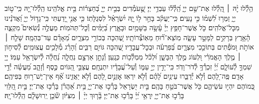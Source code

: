 \documentclass[twoside, openany, parskip=half, 11pt]{book}
\begin{document}
\begin{narrow}
הַ֥לְ֯לוּ יׇ֨הּ ׀
הַֽ֭לְ֯לוּ אֶת־שֵׁ֣ם יְיָ֑ הַֽ֝לְ֯ל֗וּ עַבְדֵ֥י יְיָ׃
שֶׁ֣֭עֹמְ֯דִים בְּבֵ֣ית יְיָ֑ בְּ֝חַצְר֗וֹת בֵּ֣ית אֱלֹהֵֽינוּ׃
הַֽלְ֯לוּ־יׇ֭הּ כִּֽי־ט֣וֹב יְיָ֑ זַמְּר֥וּ לִ֝שְׁמ֗וֹ כִּ֣י נָעִֽים׃
כִּֽי־יַעֲקֹ֗ב בָּחַ֣ר ל֣וֹ יׇ֑הּ יִ֝שְׂרָאֵ֗ל לִסְגֻלָּתֽוֹ׃
כִּ֤י אֲנִ֣י יָ֭דַעְתִּי כִּֽי־גָד֣וֹל יְיָ֑ וַ֝אֲדֹנֵ֗ינוּ מִכׇּל־אֱלֹהִֽים׃
כֹּ֤ל אֲשֶׁר־חָפֵ֥ץ יְיָ֗ עָ֫שָׂ֥ה בַּשָּׁמַ֥יִם וּבָאָ֑רֶץ בַּ֝יַּמִּ֗ים וְ֯כׇל־תְּהֹמֽוֹת׃
מַעֲלֶ֣ה נְ֯שִׂאִים֮ מִקְצֵ֢ה הָ֫אָ֥רֶץ בְּרָקִ֣ים לַמָּטָ֣ר עָשָׂ֑ה מֽוֹצֵא־ר֗֝וּחַ מֵאֽוֹצְ֯רוֹתָֽיו׃
שֶׁ֭הִכָּה בְּכוֹרֵ֣י מִצְרָ֑יִם מֵ֝אָדָ֗ם עַד־בְּהֵמָֽה׃
שָׁלַ֤ח ׀ אוֹתֹ֣ת וּ֭מֹפְ֯תִים בְּתוֹכֵ֣כִי מִצְרָ֑יִם בְּ֝פַרְעֹ֗ה וּבְכׇל־עֲבָדָֽיו׃
שֶׁ֭הִכָּה גּוֹיִ֣ם רַבִּ֑ים וְ֝הָרַ֗ג מְ֯לָכִ֥ים עֲצוּמִֽים׃
לְ֯סִיח֤וֹן ׀ מֶ֤לֶךְ הָאֱמֹרִ֗י וּ֭לְעוֹג מֶ֣לֶךְ הַבָּשָׁ֑ן וּ֝לְכֹ֗ל מַמְלְ֯כ֥וֹת כְּנָֽעַן׃
וְ֯נָתַ֣ן אַרְצָ֣ם נַחֲלָ֑ה נַ֝חֲלָ֗ה לְ֯יִשְׂרָאֵ֥ל עַמּֽוֹ׃
יְיָ֭ שִׁמְךָ֣ לְ֯עוֹלָ֑ם יְ֝יָ֗ זִכְרְ֯ךָ֥ לְ֯דֹר־וָדֹֽר׃
כִּֽי־יָדִ֣ין יְיָ֣ עַמּ֑וֹ וְ֯עַל־עֲ֝בָדָ֗יו יִתְנֶחָֽם׃
עֲצַבֵּ֣י הַ֭גּוֹיִם כֶּ֣סֶף וְ֯זָהָ֑ב מַ֝עֲשֵׂ֗ה יְ֯דֵ֣י אָדָֽם׃
פֶּֽה־לָ֭הֶם וְ֯לֹ֣א יְ֯דַבֵּ֑רוּ עֵינַ֥יִם לָ֝הֶ֗ם וְ֯לֹ֣א יִרְאֽוּ׃
אׇזְנַ֣יִם לָ֭הֶם וְ֯לֹ֣א יַאֲזִ֑ינוּ אַ֗֝ף אֵין־יֶשׁ־ר֥וּחַ בְּפִיהֶֽם׃
כְּ֭מוֹהֶם יִהְי֣וּ עֹשֵׂיהֶ֑ם כֹּ֖ל אֲשֶׁר־בֹּטֵ֣חַ בָּהֶֽם׃
בֵּ֣ית יִ֭שְׂרָאֵל בָּרְ֯כ֣וּ אֶת־יְיָ֑ בֵּ֥ית אַ֝הֲרֹ֗ן בָּרְ֯כ֥וּ אֶת־יְיָ׃
בֵּ֣ית הַ֭לֵּוִי בָּרְ֯כ֣וּ אֶת־יְיָ֑ יִֽרְאֵ֥י יְ֝יָ֗ בָּרְ֯כ֥וּ אֶת־יְיָ׃
בָּ֘ר֤וּךְ יְיָ֨ ׀ מִצִּיּ֗וֹן שֹׁ֘כֵ֤ן יְֽרוּשָׁלָ֗‍ִם הַֽלְ֯לוּ־יׇֽהּ׃




\end{narrow}
\end{document}
